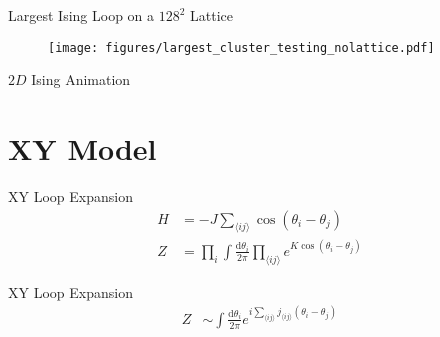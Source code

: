 \documentclass[10pt]{beamer}
\begin{document}
\begin{frame}{Largest Ising Loop on a $128^2$ Lattice}
    \begin{figure}[h!]
        \centering
            \texttt{[image: figures/largest\_cluster\_testing\_nolattice.pdf]}
    \end{figure}
\end{frame}

\begin{frame}{$2D$ Ising Animation}
\end{frame}

\section{XY Model}

\begin{frame}{XY Loop Expansion}
    \begin{align*}
        H &= - J \sum_{\langle ij \rangle} \cos(\theta_i - \theta_j) \\
        Z &= \prod_i \int \frac{\mathrm d \theta_i}{2 \pi} \prod_{\langle ij \rangle} e^{K  \cos(\theta_i - \theta_j)}
    \end{align*}
\end{frame}

\begin{frame}{XY Loop Expansion}
    \begin{align*}
        Z &\sim \int \frac{\mathrm d \theta_i}{2 \pi} e^{i \sum_{\langle ij \rangle} j_{\langle ij \rangle} (\theta_i - \theta_j)} \\
    \end{align*}
\end{frame}
\end{document}
